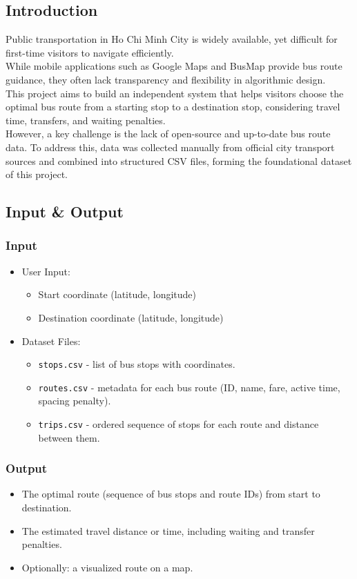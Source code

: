 \subsection{Introduction}
Public transportation in Ho Chi Minh City is widely available, yet difficult for first-time visitors to navigate efficiently.\\
While mobile applications such as Google Maps and BusMap provide bus route guidance, they often lack transparency and flexibility in algorithmic design.\\
This project aims to build an independent system that helps visitors choose the optimal bus route from a starting stop to a destination stop, considering travel time, transfers, and waiting penalties.\\
However, a key challenge is the lack of open-source and up-to-date bus route data.
To address this, data was collected manually from official city transport sources and combined into structured CSV files, forming the foundational dataset of this project.
\subsection{Input \& Output}
\subsubsection{Input}
\begin{itemize}
    \item User Input:
    \begin{itemize}
        \item Start coordinate (latitude, longitude)
        \item Destination coordinate (latitude, longitude)
    \end{itemize}
    \item Dataset Files:
    \begin{itemize}
        \item \texttt{stops.csv} - list of bus stops with coordinates.
        \item \texttt{routes.csv} - metadata for each bus route (ID, name, fare, active time, spacing penalty).
        \item \texttt{trips.csv} - ordered sequence of stops for each route and distance between them.
    \end{itemize}
\end{itemize}

\subsubsection{Output}
\begin{itemize}
    \item The optimal route (sequence of bus stops and route IDs) from start to destination.
    \item The estimated travel distance or time, including waiting and transfer penalties.
    \item Optionally: a visualized route on a map.
\end{itemize}


